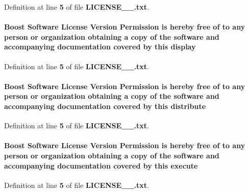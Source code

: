 Definition at line {\bf 5} of file {\bf L\+I\+C\+E\+N\+S\+E\+\_\+\_.\+txt}.

\paragraph[{display}]{\setlength{\rightskip}{0pt plus 5cm}Boost {\bf Software} License Version Permission is hereby free of to any person or organization obtaining a copy of the software and accompanying documentation covered by this display}\label{LICENSE__1__0_8txt_a65ce1a5567a8cf46577b08f5ac9c09da}


Definition at line {\bf 5} of file {\bf L\+I\+C\+E\+N\+S\+E\+\_\+\_.\+txt}.

\paragraph[{distribute}]{\setlength{\rightskip}{0pt plus 5cm}Boost {\bf Software} License Version Permission is hereby free of to any person or organization obtaining a copy of the software and accompanying documentation covered by this distribute}\label{LICENSE__1__0_8txt_a3c89cb107ac71ac6c59af1b48094e90f}


Definition at line {\bf 5} of file {\bf L\+I\+C\+E\+N\+S\+E\+\_\+\_.\+txt}.

\paragraph[{execute}]{\setlength{\rightskip}{0pt plus 5cm}Boost {\bf Software} License Version Permission is hereby free of to any person or organization obtaining a copy of the software and accompanying documentation covered by this execute}\label{LICENSE__1__0_8txt_a89433f6bae83e12328d00dd5a2922de9}


Definition at line {\bf 5} of file {\bf L\+I\+C\+E\+N\+S\+E\+\_\+\_.\+txt}.

